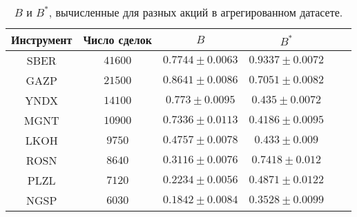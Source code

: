 \begin{table}[h!]
    \begin{center}
        \begin{tabular}{|c|c|c|c|c|c|}
            \hline
            Инструмент        & Число сделок & $B$ & $B^*$ \\ \hline
            SBER & $41600 $ & $ 0.7744 \pm 0.0063 $ & $ 0.9337 \pm 0.0072 $ \\ \hline
            GAZP & $21500 $ & $ 0.8641 \pm 0.0086 $ & $ 0.7051 \pm 0.0082 $ \\ \hline
            YNDX & $14100 $ & $ 0.773  \pm 0.0095 $ & $ 0.435  \pm 0.0072 $ \\ \hline
            MGNT & $10900 $ & $ 0.7336 \pm 0.0113 $ & $ 0.4186 \pm 0.0095 $ \\ \hline
            LKOH & $9750  $ & $ 0.4757 \pm 0.0078 $ & $ 0.433  \pm 0.009  $\\ \hline
            ROSN & $8640  $ & $ 0.3116 \pm 0.0076 $ & $ 0.7418 \pm 0.012  $\\ \hline
            PLZL & $7120  $ & $ 0.2234 \pm 0.0056 $ & $ 0.4871 \pm 0.0122 $ \\ \hline
            NGSP & $6030  $ & $ 0.1842 \pm 0.0084 $ & $ 0.3528 \pm 0.0099 $ \\ \hline
        \end{tabular}
    \end{center}
    \caption{$B$ и $B ^*$, вычисленные для разных акций в агрегированном датасете.}
    \label{Aggreg1SE}
    \end{table} 
